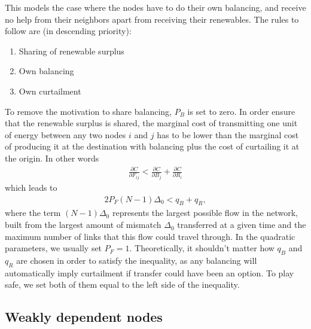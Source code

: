 \documentclass[english,twoside,a4paper,11pt]{article}
\numberwithin{equation}{section}
\begin{document}
This models the case where the nodes have to do their own balancing,
and receive no help from their neighbors apart from receiving their
renewables. The rules to follow are (in descending priority):
\begin{enumerate}
\item Sharing of renewable surplus
\item Own balancing
\item Own curtailment
\end{enumerate}
To remove the motivation to share balancing, $P_B$ is set to zero. In
order ensure that the renewable surplus is shared, the marginal cost
of transmitting one unit of energy between any two nodes $i$ and $j$
has to be lower than the marginal cost of producing it at the
destination with balancing plus the cost of curtailing it at the
origin. In other words 
\begin{align}
\frac{\partial C}{\partial F_{ij}} < 
\frac{\partial C}{\partial B_j} +\frac{\partial C}{\partial R_i}
\label{eq:trans1}
\end{align}
which leads to
\begin{align*}
2P_F ( N-1) \Delta_0 < q_B + q_R,
\end{align*}
where the term $(N-1)\Delta_0$ represents the largest possible flow in
the network, built from the largest amount of mismatch $\Delta_0$
transferred at a given time and the maximum number of links that this flow
could travel through. In the quadratic parameters, we usually set $P_F
=1$. Theoretically, it shouldn't matter how $q_B$ and $q_R$ are chosen
in order to satisfy the inequality, as any balancing will automatically
imply curtailment if transfer could have been an option. To play
safe, we set both of them equal to the left side of the inequality.

\subsection{Weakly dependent nodes}
\end{document}
